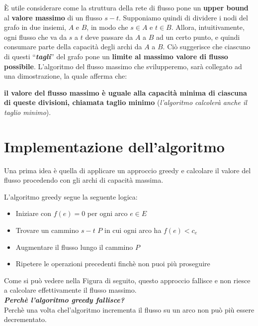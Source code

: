 È utile considerare come la struttura della rete di flusso pone un
\textbf{upper bound} al \textbf{valore massimo} di un flusso $s-t$.
Supponiamo quindi di dividere i nodi del grafo in due insiemi, $A$ e
$B$, in modo che $s \in A$ e $t \in B$. Allora, intuitivamente,
ogni flusso che va da $s$ a $t$ deve passare da $A$ a $B$ ad un
certo punto, e quindi consumare parte della capacità degli archi da
$A$ a $B$. Ciò suggerisce che ciascuno di questi
``\textbf{\emph{tagli}}'' del grafo pone un \textbf{limite al massimo
valore di flusso possibile}. L'algoritmo del flusso massimo che
svilupperemo, sarà collegato ad una dimostrazione, la quale afferma che:
\begin{myblockquote}
    \textbf{il valore del flusso massimo è uguale alla
    capacità minima di ciascuna di queste divisioni, chiamata taglio minimo}
    (\emph{l'algoritmo calcolerà anche il taglio minimo}).
\end{myblockquote}



\section{Implementazione dell'algoritmo}

Una prima idea è quella di applicare un approccio greedy e calcolare il
valore del flusso procedendo con gli archi di capacità massima.

L'algoritmo greedy segue la seguente logica:
\begin{itemize}
    \item Iniziare con $f(e) = 0$ per ogni arco $e \in E$
    \item Trovare un cammino $s-t$ $P$ in cui ogni arco ha $f(e) < c_e$ 
    \item Augmentare il flusso lungo il cammino $P$
    \item Ripetere le operazioni precedenti finchè non puoi più proseguire
\end{itemize}

Come si può vedere nella Figura di seguito, questo approccio fallisce e
non riesce a calcolare effettivamente il flusso massimo.\\

\textbf{\emph{Perchè l'algoritmo greedy fallisce?}}\\
Perchè una volta chel'algoritmo incrementa il flusso su un arco non
può più essere decrementato.

